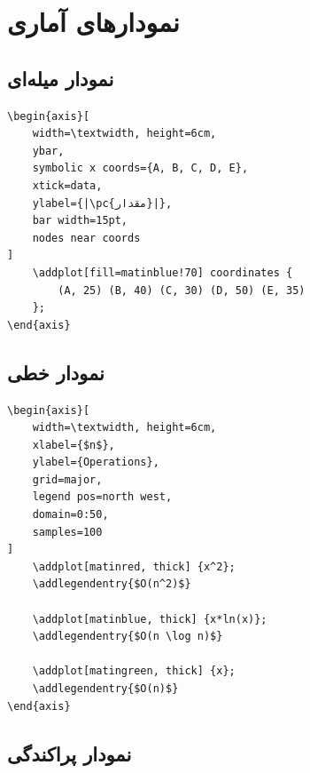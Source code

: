 
\section{نمودارهای آماری}
\label{sec:graphics-statistical}

\subsection{نمودار میله‌ای}
\label{sec:graphics-bar}

\begin{latin}
\begin{verbatim}
\begin{axis}[
    width=\textwidth, height=6cm,
    ybar,
    symbolic x coords={A, B, C, D, E},
    xtick=data,
    ylabel={|\pc{مقدار}|},
    bar width=15pt,
    nodes near coords
]
    \addplot[fill=matinblue!70] coordinates {
        (A, 25) (B, 40) (C, 30) (D, 50) (E, 35)
    };
\end{axis}
\end{verbatim}
\end{latin}


\subsection{نمودار خطی}
\label{sec:graphics-line}

\begin{latin}
\begin{verbatim}
\begin{axis}[
    width=\textwidth, height=6cm,
    xlabel={$n$},
    ylabel={Operations},
    grid=major,
    legend pos=north west,
    domain=0:50,
    samples=100
]
    \addplot[matinred, thick] {x^2};
    \addlegendentry{$O(n^2)$}

    \addplot[matinblue, thick] {x*ln(x)};
    \addlegendentry{$O(n \log n)$}

    \addplot[matingreen, thick] {x};
    \addlegendentry{$O(n)$}
\end{axis}
\end{verbatim}
\end{latin}

\subsection{نمودار پراکندگی}
\label{sec:graphics-scatter}


